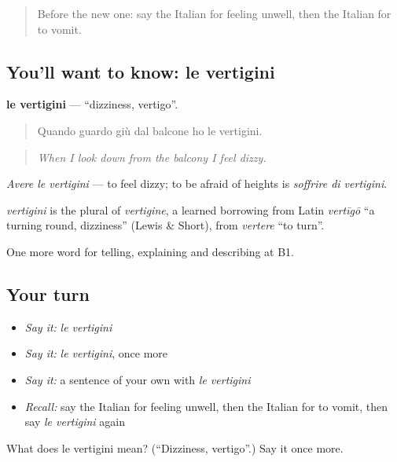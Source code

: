 \label{lesson:IT-C487-vertigini}



\begin{quote}
Before the new one: say the Italian for feeling unwell, then the Italian for to vomit.
\end{quote}

\subsection*{You'll want to know: le vertigini}
\textbf{le vertigini} — \textquotedblleft{}dizziness, vertigo\textquotedblright{}.

\begin{quote}
Quando guardo giù dal balcone ho le vertigini.
\end{quote}

\begin{quote}
\emph{When I look down from the balcony I feel dizzy.}
\end{quote}

\emph{Avere le vertigini} — to feel dizzy; to be afraid of heights is \emph{soffrire di vertigini}.

\begin{cousinweb}
\emph{vertigini} is the plural of \emph{vertigine}, a learned borrowing from Latin \emph{vertīgō} \textquotedblleft{}a turning round, dizziness\textquotedblright{} (Lewis \& Short), from \emph{vertere} \textquotedblleft{}to turn\textquotedblright{}.
\end{cousinweb}

\begin{grammarlens}[title={What you've built}]
One more word for telling, explaining and describing at B1.
\end{grammarlens}

\subsection*{Your turn}
\begin{itemize}
\raggedright
  \item \emph{Say it:} \emph{le vertigini}
  \item \emph{Say it:} \emph{le vertigini}, once more
  \item \emph{Say it:} a sentence of your own with \emph{le vertigini}
  \item \emph{Recall:} say the Italian for feeling unwell, then the Italian for to vomit, then say \emph{le vertigini} again
\end{itemize}

\begin{tcolorbox}[breakable,colback=teal!4,colframe=teal!35!black,title={Before you move on}]
What does le vertigini mean? (\textquotedblleft{}Dizziness, vertigo\textquotedblright{}.) Say it once more.
\end{tcolorbox}
